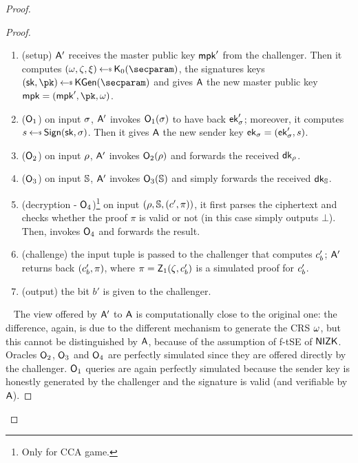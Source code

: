 \begin{proof}
\begin{lemma}
\begin{proof}
            \begin{enumerate}
                \item (setup) $\mathsf{A}'$ receives the master public key $\mathsf{mpk}'$ from the challenger. Then it computes $(\crs,\tpsim,\tpext)\getsr\nizkext_0(\secparam)$, the signatures keys $(\sk, \pk) \getsr \kgen(\secparam)$ and gives $\mathsf{A}$ the new master public key $\mpk = (\mpk', \pk, \crs)$.
                \item ($\mathsf{O}_1$) on input $\sigma$, $\mathsf{A}'$ invokes $\mathsf{O}_1(\sigma)$ to have back $\mathsf{ek}'_\sigma$; moreover, it computes $\signature \getsr \sign(\sk, \sattr)$. Then it gives $\mathsf{A}$ the new sender key $\mathsf{ek}_\sigma = (\mathsf{ek}'_\sigma, s)$.
                \item ($\mathsf{O}_2$) on input $\rho$, $\mathsf{A}'$ invokes $\mathsf{O}_2(\rho)$ and forwards the received $\mathsf{dk}_\rho$.
                \item ($\mathsf{O}_3$) on input $\mathbb{S}$, $\mathsf{A}'$ invokes $\mathsf{O}_3(\mathbb{S})$ and simply forwards the received $\mathsf{dk}_{\mathbb{S}}$.
                \item (decryption - $\mathsf{O}_4$)\footnote{Only for CCA game.} on input $(\rho, \mathbb{S}, (c', \pi))$, it first parses the ciphertext and checks whether the proof $\pi$ is valid or not (in this case simply outputs $\bot$). Then, invokes $\mathsf{O}_4$ and forwards the result.
                \item (challenge) the input tuple is passed to the challenger that computes $c'_b$; $\mathsf{A}'$ returns back $(c'_b, \pi)$, where $\pi = \mathsf{Z}_1(\zeta, c'_b)$ is a simulated proof for $c'_b$.
                \item (output) the bit $b'$ is given to the challenger.
            \end{enumerate}
            ~\newline
            The view offered by $\mathsf{A}'$ to $\mathsf{A}$ is computationally close to the original one: the difference, again, is due to the different mechanism to generate the CRS $\omega$, but this cannot be distinguished by $\mathsf{A}$, because of the assumption of f-tSE of $\mathsf{NIZK}$.
            Oracles $\mathsf{O}_2$, $\mathsf{O}_3$ and $\mathsf{O}_4$ are perfectly simulated since they are offered directly by the challenger.
            $\mathsf{O}_1$ queries are again perfectly simulated because the sender key is honestly generated by the challenger and the signature is valid (and verifiable by $\mathsf{A}$).
        \end{proof}
    \end{lemma}


\end{proof}
